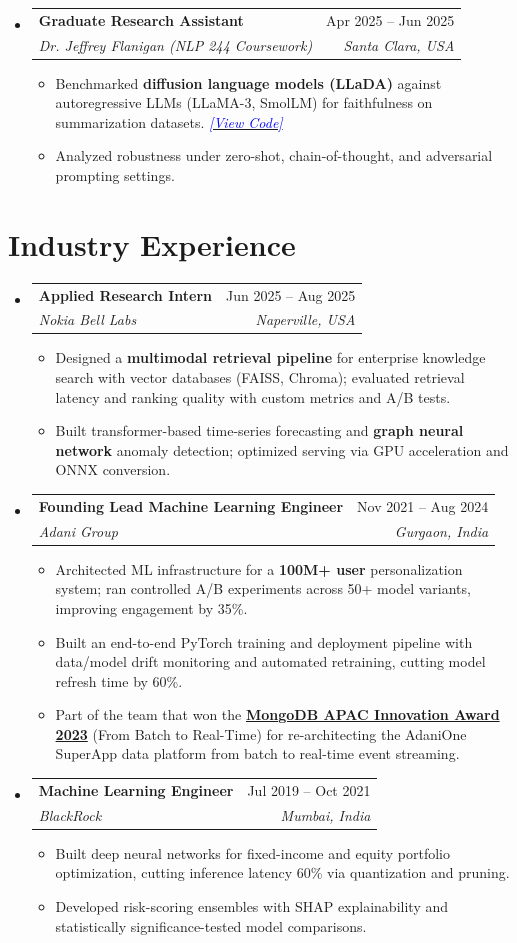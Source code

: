 \documentclass[letterpaper,11pt]{article}
\makeatletter
\newcommand{\resumeItem}[1]{
  \item{
    {#1 \vspace{-4pt}}
  }
}
\newcommand{\resumeSubheading}[4]{
  \vspace{-2pt}\item
    \begin{tabular*}{0.97\textwidth}[t]{l@{\extracolsep{\fill}}r}
      \textbf{#1} & #2 \\
      \textit{\small #3} & \textit{\small #4} \\
    \end{tabular*}\vspace{-10pt}
}
\newcommand{\resumeSubHeadingListStart}{\begin{itemize}[leftmargin=0.15in, label={}]}
\newcommand{\resumeSubHeadingListEnd}{\end{itemize}}
\newcommand{\resumeItemListStart}{\begin{itemize}}
\newcommand{\resumeItemListEnd}{\end{itemize}\vspace{-2pt}}
\newcommand{\codelink}[1]{\href{#1}{\textcolor{blue}{\textit{[View Code]}}}}
\makeatother
\begin{document}
\resumeSubHeadingListStart
\resumeSubheading
  {Graduate Research Assistant}{Apr 2025 -- Jun 2025}
  {Dr. Jeffrey Flanigan (NLP 244 Coursework)}{Santa Clara, USA}
  \resumeItemListStart
    \small
    \resumeItem{Benchmarked \textbf{diffusion language models (LLaDA)} against autoregressive LLMs (LLaMA-3, SmolLM) for faithfulness on summarization datasets. \codelink{https://github.com/shubham2345/llada-faithful-summarization}}
    \resumeItem{Analyzed robustness under zero-shot, chain-of-thought, and adversarial prompting settings.}
  \resumeItemListEnd
\resumeSubHeadingListEnd

\section{Industry Experience}
\resumeSubHeadingListStart
\resumeSubheading
  {Applied Research Intern}{Jun 2025 -- Aug 2025}
  {Nokia Bell Labs}{Naperville, USA}
  \resumeItemListStart
    \small
    \resumeItem{Designed a \textbf{multimodal retrieval pipeline} for enterprise knowledge search with vector databases (FAISS, Chroma); evaluated retrieval latency and ranking quality with custom metrics and A/B tests.}
    \resumeItem{Built transformer-based time-series forecasting and \textbf{graph neural network} anomaly detection; optimized serving via GPU acceleration and ONNX conversion.}
  \resumeItemListEnd
\resumeSubHeadingListEnd

\resumeSubHeadingListStart
    \resumeSubheading
      {Founding Lead Machine Learning Engineer}{Nov 2021 -- Aug 2024}
      {Adani Group}{Gurgaon, India}
      \resumeItemListStart
        \small
        \resumeItem{Architected ML infrastructure for a \textbf{100M+ user} personalization system; ran controlled A/B experiments across 50+ model variants, improving engagement by 35\%.}
        \resumeItem{Built an end-to-end PyTorch training and deployment pipeline with data/model drift monitoring and automated retraining, cutting model refresh time by 60\%.}
        \resumeItem{Part of the team that won the \href{https://www.mongodb.com/company/blog/events/congratulations-2023-apac-innovation-award-winners}{\textbf{MongoDB APAC Innovation Award 2023}} (From Batch to Real-Time) for re-architecting the AdaniOne SuperApp data platform from batch to real-time event streaming.}
      \resumeItemListEnd

    \resumeSubheading
      {Machine Learning Engineer}{Jul 2019 -- Oct 2021}
      {BlackRock}{Mumbai, India}
      \resumeItemListStart
        \small
        \resumeItem{Built deep neural networks for fixed-income and equity portfolio optimization, cutting inference latency 60\% via quantization and pruning.}
        \resumeItem{Developed risk-scoring ensembles with SHAP explainability and statistically significance-tested model comparisons.}
      \resumeItemListEnd
\resumeSubHeadingListEnd
\end{document}

